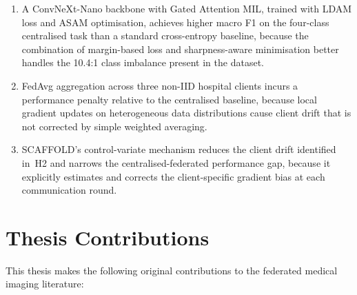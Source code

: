 \begin{enumerate}

  \item[\textbf{H1.}] A ConvNeXt-Nano backbone with Gated Attention MIL, trained
  with LDAM loss and ASAM optimisation, achieves higher macro F1 on the four-class
  centralised task than a standard cross-entropy baseline, because the combination
  of margin-based loss and sharpness-aware minimisation better handles the
  10.4:1 class imbalance present in the dataset.

  \item[\textbf{H2.}] FedAvg aggregation across three non-IID hospital clients
  incurs a performance penalty relative to the centralised baseline, because local
  gradient updates on heterogeneous data distributions cause client drift that is
  not corrected by simple weighted averaging.

  \item[\textbf{H3.}] SCAFFOLD's control-variate mechanism reduces the client
  drift identified in~H2 and narrows the centralised-federated performance gap,
  because it explicitly estimates and corrects the client-specific gradient bias
  at each communication round.

\end{enumerate}

\section{Thesis Contributions}
\label{sec:contributions}

This thesis makes the following original contributions to the federated medical
imaging literature:

